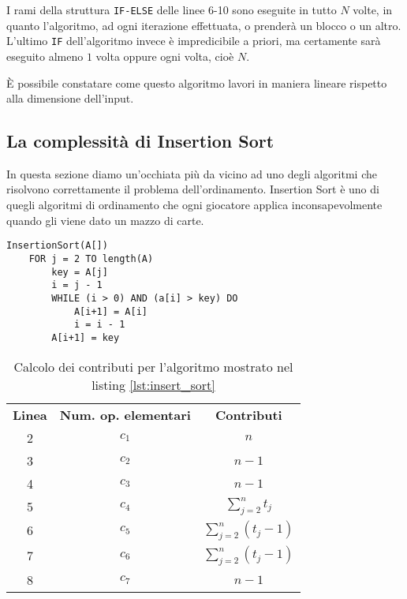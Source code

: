 \documentclass[11pt,a4paper,oneside]{article}
\begin{document}
I rami della struttura \texttt{IF-ELSE} delle linee 6-10 sono eseguite in tutto $N$ volte, in quanto l'algoritmo, ad ogni iterazione effettuata, o prenderà un blocco o un altro. L'ultimo \texttt{IF} dell'algoritmo invece è impredicibile a priori, ma certamente sarà eseguito almeno $1$ volta oppure ogni volta, cioè $N$.

È possibile constatare come questo algoritmo lavori in maniera lineare rispetto alla dimensione dell'input.

\subsection{La complessità di Insertion Sort}
In questa sezione diamo un'occhiata più da vicino ad uno degli algoritmi che risolvono correttamente il problema dell'ordinamento. Insertion Sort è uno di quegli algoritmi di ordinamento che ogni giocatore applica inconsapevolmente quando gli viene dato un mazzo di carte.
\pagebreak
\begin{lstlisting}[caption={Insertion Sort},label={lst:insert_sort}]
InsertionSort(A[])
	FOR j = 2 TO length(A)
		key = A[j]
		i = j - 1
		WHILE (i > 0) AND (a[i] > key) DO
			A[i+1] = A[i]
			i = i - 1
		A[i+1] = key
\end{lstlisting}

\begin{table}[hb]
	\centering
	\begin{tabular}{ c | c | c }
		\textbf{Linea} & \textbf{Num. op. elementari} & \textbf{Contributi} \\ 
		2 & $c_1$ & $n$ \\
		3 & $c_2$ & $n-1$ \\
		4 & $c_3$ & $n-1$ \\ 
		5 & $c_4$ & $\sum_{j=2}^{n}t_j$ \\
		6 & $c_5$ & $\sum_{j=2}^{n}(t_j-1)$ \\
		7 & $c_6$ & $\sum_{j=2}^{n}(t_j-1)$ \\
		8 & $c_7$ & $n-1$ \\ 
	\end{tabular}
	\caption{Calcolo dei contributi per l'algoritmo mostrato nel listing \ref{lst:insert_sort}}
	\label{tbl:insert_sort}
\end{table}
\end{document}
